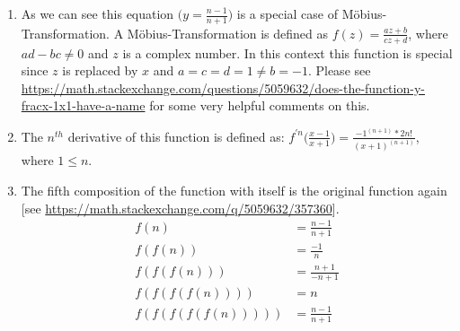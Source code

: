 \documentclass[10pt, twoside]{article}
\begin{document}
\begin{enumerate}
\item As we can see this equation $\Big(y=\frac{n-1}{n+1}\Big)$ is a special case of  Möbius-Transformation. A Möbius-Transformation is defined as $f(z) = \frac{az+b}{cz+d}$, where $ad-bc \ne 0$ and $z$ is a complex number. In this context this function is special since $z$ is replaced by $x$ and $a=c=d=1 \ne b=-1$. Please see \url{https://math.stackexchange.com/questions/5059632/does-the-function-y-fracx-1x1-have-a-name} for some very helpful comments on this.
\item The $n^{th}$ derivative of this function is defined as: $f^{'n}\Big(\frac{x-1}{x+1}\Big) = \frac{{-1}^{(n+1)}*2n!}{{(x+1)}^{(n+1)}}$, where $1 \le n$.
\item The fifth composition of the function with itself is the original function again [see \url{https://math.stackexchange.com/q/5059632/357360}].\newline
\begin{align*}
f(n) &= \frac{n-1}{n+1} \\
f(f(n)) &= \frac{-1}{n} \\
f(f(f(n))) &= \frac{n+1}{-n+1} \\
f(f(f(f(n)))) &= n \\
f(f(f(f(f(n))))) &= \frac{n-1}{n+1}
\end{align*}
\end{enumerate}
 
 
\end{document}
